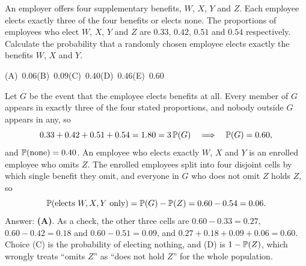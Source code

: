 \begin{example}
An employer offers four supplementary benefits, $W$, $X$, $Y$ and $Z$. Each employee elects
exactly three of the four benefits or elects none. The proportions of employees who elect
$W$, $X$, $Y$ and $Z$ are $0.33$, $0.42$, $0.51$ and $0.54$ respectively. Calculate the
probability that a randomly chosen employee elects exactly the benefits $W$, $X$ and $Y$.

\smallskip\noindent (A)~$0.06$\hfill (B)~$0.09$\hfill (C)~$0.40$\hfill (D)~$0.46$\hfill (E)~$0.60$\hfill\mbox{}
\end{example}
\begin{solution}
Let $G$ be the event that the employee elects benefits at all. Every member of $G$ appears
in exactly three of the four stated proportions, and nobody outside $G$ appears in any, so
\[
0.33 + 0.42 + 0.51 + 0.54 = 1.80 = 3\,\mathbb{P}(G) \quad\Longrightarrow\quad \mathbb{P}(G) = 0.60,
\]
and $\mathbb{P}(\text{none}) = 0.40$. An employee who elects exactly $W$, $X$ and $Y$ is an
enrolled employee who omits $Z$. The enrolled employees split into four disjoint cells by
which single benefit they omit, and everyone in $G$ who does not omit $Z$ holds $Z$, so
\[
\mathbb{P}(\text{elects } W, X, Y \text{ only}) = \mathbb{P}(G) - \mathbb{P}(Z) = 0.60 - 0.54 = 0.06.
\]
Answer: \textbf{(A)}. As a check, the other three cells are $0.60 - 0.33 = 0.27$,
$0.60 - 0.42 = 0.18$ and $0.60 - 0.51 = 0.09$, and $0.27 + 0.18 + 0.09 + 0.06 = 0.60$.
Choice (C) is the probability of electing nothing, and (D) is $1 - \mathbb{P}(Z)$, which wrongly
treats ``omits $Z$'' as ``does not hold $Z$'' for the whole population.
\end{solution}

